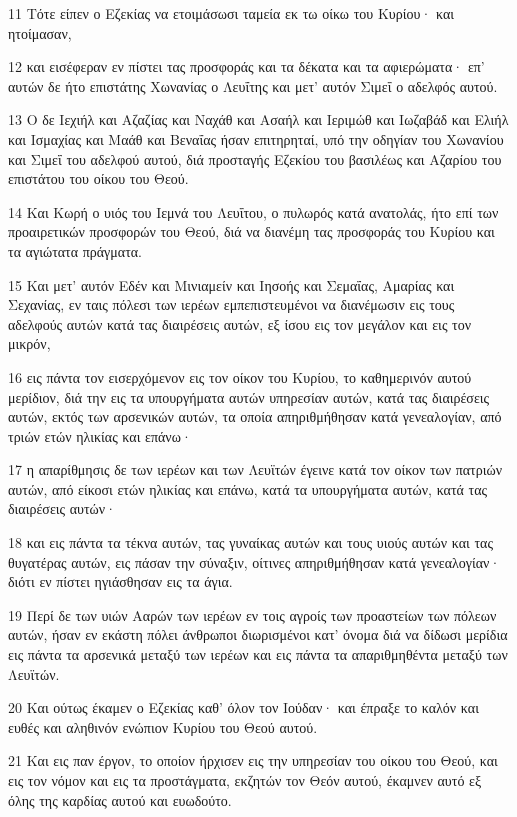 \par 11 Τότε είπεν ο Εζεκίας να ετοιμάσωσι ταμεία εκ τω οίκω του Κυρίου· και ητοίμασαν,
\par 12 και εισέφεραν εν πίστει τας προσφοράς και τα δέκατα και τα αφιερώματα· επ' αυτών δε ήτο επιστάτης Χωνανίας ο Λευΐτης και μετ' αυτόν Σιμεΐ ο αδελφός αυτού.
\par 13 Ο δε Ιεχιήλ και Αζαζίας και Ναχάθ και Ασαήλ και Ιεριμώθ και Ιωζαβάδ και Ελιήλ και Ισμαχίας και Μαάθ και Βεναΐας ήσαν επιτηρηταί, υπό την οδηγίαν του Χωνανίου και Σιμεΐ του αδελφού αυτού, διά προσταγής Εζεκίου του βασιλέως και Αζαρίου του επιστάτου του οίκου του Θεού.
\par 14 Και Κωρή ο υιός του Ιεμνά του Λευΐτου, ο πυλωρός κατά ανατολάς, ήτο επί των προαιρετικών προσφορών του Θεού, διά να διανέμη τας προσφοράς του Κυρίου και τα αγιώτατα πράγματα.
\par 15 Και μετ' αυτόν Εδέν και Μινιαμείν και Ιησοής και Σεμαΐας, Αμαρίας και Σεχανίας, εν ταις πόλεσι των ιερέων εμπεπιστευμένοι να διανέμωσιν εις τους αδελφούς αυτών κατά τας διαιρέσεις αυτών, εξ ίσου εις τον μεγάλον και εις τον μικρόν,
\par 16 εις πάντα τον εισερχόμενον εις τον οίκον του Κυρίου, το καθημερινόν αυτού μερίδιον, διά την εις τα υπουργήματα αυτών υπηρεσίαν αυτών, κατά τας διαιρέσεις αυτών, εκτός των αρσενικών αυτών, τα οποία απηριθμήθησαν κατά γενεαλογίαν, από τριών ετών ηλικίας και επάνω·
\par 17 η απαρίθμησις δε των ιερέων και των Λευϊτών έγεινε κατά τον οίκον των πατριών αυτών, από είκοσι ετών ηλικίας και επάνω, κατά τα υπουργήματα αυτών, κατά τας διαιρέσεις αυτών·
\par 18 και εις πάντα τα τέκνα αυτών, τας γυναίκας αυτών και τους υιούς αυτών και τας θυγατέρας αυτών, εις πάσαν την σύναξιν, οίτινες απηριθμήθησαν κατά γενεαλογίαν· διότι εν πίστει ηγιάσθησαν εις τα άγια.
\par 19 Περί δε των υιών Ααρών των ιερέων εν τοις αγροίς των προαστείων των πόλεων αυτών, ήσαν εν εκάστη πόλει άνθρωποι διωρισμένοι κατ' όνομα διά να δίδωσι μερίδια εις πάντα τα αρσενικά μεταξύ των ιερέων και εις πάντα τα απαριθμηθέντα μεταξύ των Λευϊτών.
\par 20 Και ούτως έκαμεν ο Εζεκίας καθ' όλον τον Ιούδαν· και έπραξε το καλόν και ευθές και αληθινόν ενώπιον Κυρίου του Θεού αυτού.
\par 21 Και εις παν έργον, το οποίον ήρχισεν εις την υπηρεσίαν του οίκου του Θεού, και εις τον νόμον και εις τα προστάγματα, εκζητών τον Θεόν αυτού, έκαμνεν αυτό εξ όλης της καρδίας αυτού και ευωδούτο.

